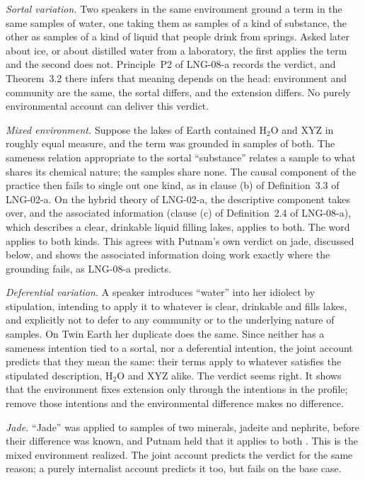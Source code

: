 \documentclass{situationist-preprint}
\begin{document}
\emph{Sortal variation.} Two speakers in the same environment ground a term in the same samples of water, one taking them as samples of a kind of substance, the other as samples of a kind of liquid that people drink from springs. Asked later about ice, or about distilled water from a laboratory, the first applies the term and the second does not. Principle~P2 of LNG-08-a records the verdict, and Theorem~3.2 there infers that meaning depends on the head: environment and community are the same, the sortal differs, and the extension differs. No purely environmental account can deliver this verdict.

\emph{Mixed environment.} Suppose the lakes of Earth contained H$_2$O and XYZ in roughly equal measure, and the term was grounded in samples of both. The sameness relation appropriate to the sortal \enquote{substance} relates a sample to what shares its chemical nature; the samples share none. The causal component of the practice then fails to single out one kind, as in clause (b) of Definition~3.3 of LNG-02-a. On the hybrid theory of LNG-02-a, the descriptive component takes over, and the associated information (clause (c) of Definition~2.4 of LNG-08-a), which describes a clear, drinkable liquid filling lakes, applies to both. The word applies to both kinds. This agrees with Putnam's own verdict on jade, discussed below, and shows the associated information doing work exactly where the grounding fails, as LNG-08-a predicts.

\emph{Deferential variation.} A speaker introduces \enquote{water} into her idiolect by stipulation, intending to apply it to whatever is clear, drinkable and fills lakes, and explicitly not to defer to any community or to the underlying nature of samples. On Twin Earth her duplicate does the same. Since neither has a sameness intention tied to a sortal, nor a deferential intention, the joint account predicts that they mean the same: their terms apply to whatever satisfies the stipulated description, H$_2$O and XYZ alike. The verdict seems right. It shows that the environment fixes extension only through the intentions in the profile; remove those intentions and the environmental difference makes no difference.

\emph{Jade.} \enquote{Jade} was applied to samples of two minerals, jadeite and nephrite, before their difference was known, and Putnam held that it applies to both \citep{Putnam1975}. This is the mixed environment realized. The joint account predicts the verdict for the same reason; a purely internalist account predicts it too, but fails on the base case.
\end{document}
